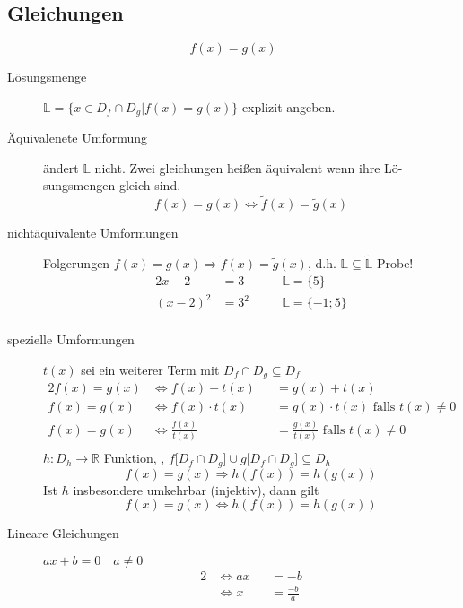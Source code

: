 \subsection{Gleichungen}
$$f(x)=g(x)$$
\begin{description}
    \item[Lösungsmenge] $\mathbb{L} = \lbrace x \in D_f \cap D_g | f(x) = g(x) \rbrace$ explizit angeben.
    \item[Äquivalenete Umformung] ändert $\mathbb{L}$ nicht. Zwei gleichungen heißen äquivalent wenn ihre Lö-sungsmengen gleich sind.
    $$f(x)= g(x) \Leftrightarrow \widetilde{f}(x) = \widetilde{g}(x)$$
    \item[nichtäquivalente Umformungen]
    Folgerungen $f(x) = g(x) \Rightarrow \widetilde{f}(x) = \widetilde{g}(x)$, d.h. $\mathbb{L} \subseteq \widetilde{\mathbb{L}}$ Probe!
    \begin{alignat*}{2}
        x-2     & = 3 \quad    &  & \mathbb{L} = \lbrace 5 \rbrace     \\
        (x-2)^2 & = 3^2  \quad &  & \mathbb{L} = \lbrace -1; 5 \rbrace \\
    \end{alignat*}
    \item[spezielle Umformungen] $t(x)$ sei ein weiterer Term mit $D_f \cap D_g \subseteq D_f$
    \begin{alignat*}{2}
        f(x) = g(x) & \Leftrightarrow f(x) + t(x)       &  & = g(x) + t(x)                                     \\
        f(x) = g(x) & \Leftrightarrow f(x) \cdot t(x)   &  & = g(x) \cdot t(x)\textrm{ falls } t(x) \not = 0   \\
        f(x) = g(x) & \Leftrightarrow \frac{f(x)}{t(x)} &  & = \frac{g(x)}{t(x)}\textrm{ falls } t(x) \not = 0 \\
    \end{alignat*}
    $h : D_h \longrightarrow \mathbb{R}$ Funktion, , $f\lbrack D_f \cap D_g \rbrack \cup g\lbrack D_f \cap D_g \rbrack \subseteq D_h$
    $$f(x) = g(x) \Rightarrow h(f(x)) = h(g(x))$$
    Ist $h$ insbesondere umkehrbar (injektiv), dann gilt
    $$f(x) = g(x) \Leftrightarrow h(f(x)) = h(g(x))$$
    \item[Lineare Gleichungen] $ax + b = 0 \quad a \not = 0$
    \begin{alignat*}{2}
        & \Leftrightarrow ax &  & = -b           \\
        & \Leftrightarrow x  &  & = \frac{-b}{a} \\
    \end{alignat*}

\end{description}
